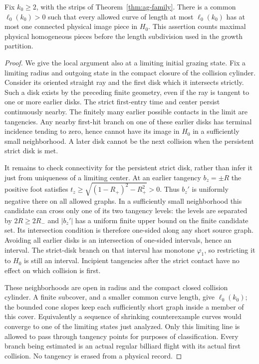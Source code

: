 \begin{lemma}
\label{lem:uc-central}
Fix $k_0\ge2$, with the strips of Theorem~\ref{thm:ag-family}.
There is a common $\ell_0(k_0)>0$ such that every allowed curve of length
at most $\ell_0(k_0)$ has at most one connected physical image piece in
$H_0$. This assertion counts maximal physical homogeneous pieces before
the length subdivision used in the growth partition.
\end{lemma}
\begin{proof}
We give the local argument also at a limiting initial grazing state.
Fix a limiting radius and outgoing state in the compact closure of the
collision cylinder. Consider its oriented straight ray and the first disk
which it intersects strictly. Such a disk exists by the preceding finite
geometry, even if the ray is tangent to one or more earlier disks.
The strict first-entry time and center persist continuously nearby.
The finitely many earlier possible contacts in the limit are tangencies.
Any nearby first-hit branch on one of these earlier disks has terminal
incidence tending to zero, hence cannot have its image in $H_0$ in a
sufficiently small neighborhood. A later disk cannot be the next collision
when the persistent strict disk is met.

It remains to check connectivity for the persistent strict disk, rather
than infer it just from uniqueness of a limiting center. At an earlier
tangency $b_z=\pm R$ the positive foot satisfies
$t_z\ge\sqrt{(1-R_+)^2-R_+^2}>0$. Thus $b_z'$ is uniformly negative
there on all allowed graphs. In a sufficiently small neighborhood this
candidate can cross only one of its two tangency levels: the levels are
separated by $2R\ge2R_-$ and $|b_z'|$ has a uniform finite upper bound
on the finite candidate set. Its intersection condition is therefore
one-sided along any short source graph. Avoiding all earlier disks is an
intersection of one-sided intervals, hence an interval. The strict-disk
branch on that interval has monotone $\varphi_1$, so restricting it to
$H_0$ is still an interval. Incipient tangencies after the strict contact
have no effect on which collision is first.

These neighborhoods are open in radius and the compact closed collision
cylinder. A finite subcover, and a smaller common curve length, give
$\ell_0(k_0)$; the bounded cone slopes keep each sufficiently short graph
inside a member of this cover. Equivalently a sequence of shrinking
counterexample curves would converge to one of the limiting states just
analyzed. Only this limiting line is allowed to pass through tangency
points for purposes of classification. Every branch being estimated is
an actual regular billiard flight with its actual first collision.
No tangency is erased from a physical record.
\end{proof}

